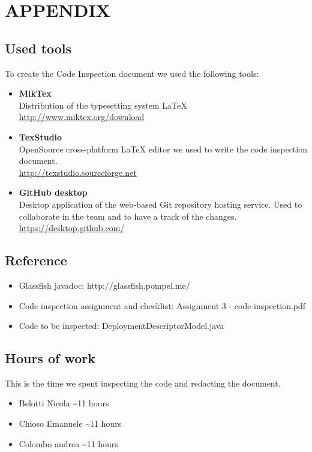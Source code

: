 \section{APPENDIX}

\subsection{Used tools}
To create the Code Inspection document we used the following tools:
\begin{itemize}
	\item \textbf{MikTex} \\ Distribution of the typesetting system LaTeX \\ \url{http://www.miktex.org/download } 
	\item \textbf{TexStudio}\\ OpenSource cross-platform LaTeX editor we used to write the code inspection document. \\ \url{http://texstudio.sourceforge.net  } 
	\item \textbf{GitHub desktop}\\ Desktop application of the web-based Git repository hosting service. Used to collaborate in the team and to have a track of the changes.  \\ \url{https://desktop.github.com/ } 
\end{itemize}

\subsection{Reference}
\begin{itemize}
	\item Glassfish javadoc: http://glassfish.pompel.me/
	\item Code inspection assignment and checklist: Assignment 3 - code inspection.pdf
	\item Code to be inspected: DeploymentDescriptorModel.java
\end{itemize}

\subsection{Hours of work}
This is the time we spent inspecting the code and redacting the document.
\begin{itemize}
	\item {Belotti Nicola} \textasciitilde 11 hours
	\item {Chioso Emanuele} \textasciitilde 11 hours
	\item {Colombo andrea} \textasciitilde 11 hours
\end{itemize}